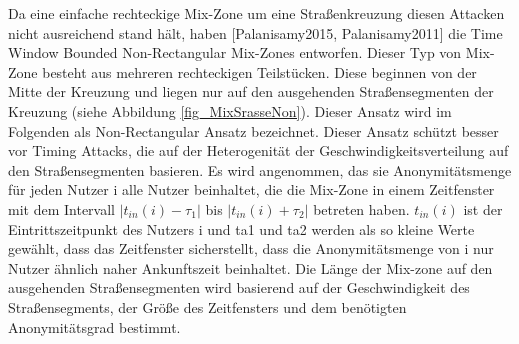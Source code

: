  Da eine einfache rechteckige Mix-Zone um eine Straßenkreuzung diesen Attacken nicht ausreichend stand hält, haben [Palanisamy2015, Palanisamy2011] die Time Window Bounded Non-Rectangular Mix-Zones entworfen. Dieser Typ von Mix-Zone besteht aus mehreren rechteckigen Teilstücken.  Diese beginnen von der Mitte der Kreuzung und liegen nur auf den ausgehenden Straßensegmenten der Kreuzung  (siehe Abbildung \ref{fig_MixSrasseNon}). Dieser Ansatz wird im Folgenden als Non-Rectangular Ansatz bezeichnet. Dieser Ansatz schützt besser vor Timing Attacks, die auf der Heterogenität der  Geschwindigkeitsverteilung auf den Straßensegmenten basieren. Es wird angenommen, das sie Anonymitätsmenge für jeden Nutzer i alle Nutzer beinhaltet, die die Mix-Zone in einem Zeitfenster mit dem Intervall $| t_{in}(i)-\tau_{1}|$ bis $|t_{in}(i)+\tau_{2}|$ betreten haben. $t_{in}(i)$ ist der Eintrittszeitpunkt des Nutzers i und ta1 und ta2 werden als so kleine Werte gewählt, dass das Zeitfenster sicherstellt, dass die Anonymitätsmenge von i nur Nutzer ähnlich naher Ankunftszeit beinhaltet. Die Länge der Mix-zone auf den ausgehenden Straßensegmenten  wird basierend auf der Geschwindigkeit des Straßensegments, der Größe des Zeitfensters und dem benötigten Anonymitätsgrad bestimmt.     